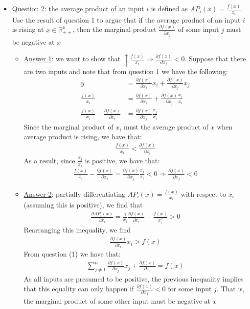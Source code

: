 \documentclass{article}
\begin{document}
  \begin{itemize}
    \item  \underline{Question 2}: the average product of an input $i$ is defined as $AP_{i}(x) = \tfrac{f(x)}{x_{i}}$. Use the result of question 1 to argue that if the average product of an input $i$ is rising at $x \in \mathbb{R}_{++}^{n}$, then the marginal product $\tfrac{\partial f(x)}{\partial x_{j}}$ of some input $j$ must be negative at $x$
    \begin{itemize}
      \item  \underline{Answer 1}: we want to show that $\uparrow \tfrac{f(x)}{x_{i}} \Rightarrow \frac{\partial f(x)}{\partial x_{j}} < 0$. Suppose that there are two inputs and note that from question 1 we have the following:
      \begin{align*}
        y &= \frac{\partial f(x)}{\partial x_{i}}x_{i} + \frac{\partial f(x)}{\partial x_{j}} x_{j} \\
        \frac{f(x)}{x_{i}} &= \frac{\partial f(x)}{\partial x_{i}} + \frac{\partial f(x)}{\partial x_{j}} \frac{x_{j}}{x_{i}} \\
        \frac{f(x)}{x_{i}} - \frac{\partial f(x)}{\partial x_{i}} &= \frac{\partial f(x)}{\partial x_{j}} \frac{x_{j}}{x_{i}} \ \tag{*}
      \end{align*}
      Since the marginal product of $x_{i}$ must the average product of $x$ when average product is rising, we have that:
      \begin{gather*}
        \frac{f(x)}{x_{i}} < \frac{\partial f(x)}{\partial x_{i}}
      \end{gather*}
      As a result, since $\frac{x_{j}}{x_{i}}$ is positive, we have that:
      \begin{gather*}
          \frac{f(x)}{x_{i}} - \frac{\partial f(x)}{\partial x_{i}} = \frac{\partial f(x)}{\partial x_{j}} \frac{x_{j}}{x_{i}} < 0 \Rightarrow \frac{\partial f(x)}{\partial x_{j}} < 0
      \end{gather*}
      \item  \underline{Answer 2}: partially differentiating $AP_{i}(x) = \tfrac{f(x)}{x_{i}}$ with respect to $x_{i}$ (assuming this is positive), we find that
      \begin{gather*}
        \frac{\partial AP_{i}(x)}{\partial x_{i}} = \frac{1}{x_{i}} \frac{\partial f(x)}{\partial x_{i}} - \frac{f(x)}{x_{i}^{2}} > 0
      \end{gather*}
      Rearranging this inequality, we find
      \begin{gather*}
        \frac{\partial f(x)}{\partial x_{i}} x_{i} > f(x)
      \end{gather*}
      From question (1) we have that:
      \begin{gather*}
        \sum_{j\neq 1}^{n} \frac{\partial f(x)}{\partial x_{j}} x_{j} + \frac{\partial f(x)}{\partial x_{i}} = f(x)
      \end{gather*}
      As all inputs are presumed to be positive, the previous inequality implies that this equality can only happen if $\tfrac{\partial f(x)}{\partial x_{j}} < 0$ for some input $j$. That is, the marginal product of some other input must be negative at $x$
    \end{itemize}
  \end{itemize}
\end{document}
